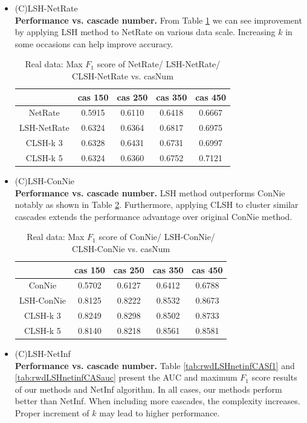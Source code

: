 \begin{itemize}
\item (C)LSH-NetRate
\\ \textbf{Performance vs. cascade number. }From Table \ref{tab:rwdLSHnetrateCASf1} we can see improvement by applying LSH method to NetRate on various data scale. Increasing $k$ in some occasions can help improve accuracy.
\begin{table}[H]
\caption{Real data: Max $F_1$ score of NetRate/  LSH-NetRate/ CLSH-NetRate vs. casNum}
\begin{tabular}{c|c|c|c|c}
 & cas 150 & cas 250 & cas 350 & cas 450 \\
 \hline
 NetRate & 0.5915 & 0.6110 & 0.6418 & 0.6667 \\
 LSH-NetRate & 0.6324 & 0.6364 & 0.6817 & 0.6975 \\
 CLSH-k 3 & 0.6328 & 0.6431 & 0.6731 & 0.6997 \\
 CLSH-k 5 & 0.6324 & 0.6360 & 0.6752 & 0.7121
\end{tabular}\label{tab:rwdLSHnetrateCASf1}
\end{table}
\item (C)LSH-ConNie
\\ \textbf{Performance vs. cascade number.} LSH method outperforms ConNie notably as shown in Table \ref{tab:rwdLSHconnieCASf1}. Furthermore, applying CLSH to cluster similar cascades extends the performance advantage over original ConNie method.
\begin{table}[H]
\caption{Real data: Max $F_1$ score of ConNie/  LSH-ConNie/ CLSH-ConNie vs. casNum}
\begin{tabular}{c|c|c|c|c}
 & cas 150 & cas 250 & cas 350 & cas 450 \\
 \hline
 ConNie & 0.5702 & 0.6127 & 0.6412 & 0.6788 \\
 LSH-ConNie & 0.8125 & 0.8222 & 0.8532 & 0.8673 \\
 CLSH-k 3 & 0.8249 & 0.8298 & 0.8502 & 0.8733 \\
 CLSH-k 5 & 0.8140 & 0.8218 & 0.8561 & 0.8581
\end{tabular}\label{tab:rwdLSHconnieCASf1}
\end{table}
\item (C)LSH-NetInf
\\ \textbf{Performance vs. cascade number.} Table \ref{tab:rwdLSHnetinfCASf1} and \ref{tab:rwdLSHnetinfCASauc} present the AUC and maximum $F_1$ score results of our methods and NetInf algorithm. In all cases, our methods perform better than NetInf. When including more cascades, the complexity increases. Proper increment of $k$ may lead to higher performance.

\end{itemize}
